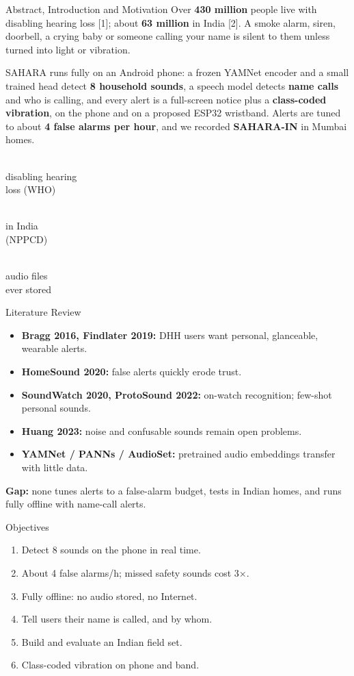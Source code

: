 \documentclass{article}
\newcommand{\bignum}[2]{\begin{minipage}[t]{0.32\linewidth}\centering{\fontsize{44}{46}\selectfont\bfseries\rmfamily\color{nm}#1}\\[1mm]{\fontsize{17}{19}\selectfont #2}\end{minipage}}
\begin{document}
\begin{minipage}[t]{0.49\linewidth}\vspace{0pt}
\begin{psec}{Abstract, Introduction and Motivation}
Over \textbf{430 million} people live with disabling hearing loss [1]; about \textbf{63 million} in India [2]. A smoke alarm, siren, doorbell, a crying baby or someone calling your name is silent to them unless turned into light or vibration.

SAHARA runs fully on an Android phone: a frozen YAMNet encoder and a small trained head detect \textbf{8 household sounds}, a speech model detects \textbf{name calls} and who is calling, and every alert is a full-screen notice plus a \textbf{class-coded vibration}, on the phone and on a proposed ESP32 wristband. Alerts are tuned to about \textbf{4 false alarms per hour}, and we recorded \textbf{SAHARA-IN} in Mumbai homes.

\vspace{3mm}
\bignum{430\,M}{disabling hearing\\loss (WHO)}\hfill\bignum{63\,M}{in India\\(NPPCD)}\hfill\bignum{0}{audio files\\ever stored}
\end{psec}

\begin{psec}{Literature Review}
\begin{itemize}
\item \textbf{Bragg 2016, Findlater 2019:} DHH users want personal, glanceable, wearable alerts.
\item \textbf{HomeSound 2020:} false alerts quickly erode trust.
\item \textbf{SoundWatch 2020, ProtoSound 2022:} on-watch recognition; few-shot personal sounds.
\item \textbf{Huang 2023:} noise and confusable sounds remain open problems.
\item \textbf{YAMNet / PANNs / AudioSet:} pretrained audio embeddings transfer with little data.
\end{itemize}
\textbf{Gap:} none tunes alerts to a false-alarm budget, tests in Indian homes, and runs fully offline with name-call alerts.
\end{psec}

\begin{psec}{Objectives}
\begin{enumerate}[leftmargin=8mm, itemsep=2pt]
\item Detect 8 sounds on the phone in real time.
\item About 4 false alarms/h; missed safety sounds cost 3$\times$.
\item Fully offline: no audio stored, no Internet.
\item Tell users their name is called, and by whom.
\item Build and evaluate an Indian field set.
\item Class-coded vibration on phone and band.
\end{enumerate}
\end{psec}


\end{minipage}
\end{document}
